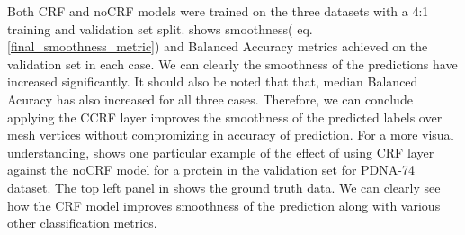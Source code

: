 Both CRF and noCRF models were trained on the three datasets with a 4:1 training and validation set
        split.  shows smoothness( eq.
        \ref{final_smoothness_metric}) and Balanced Accuracy  metrics achieved on the validation set
        in each case. We can clearly the smoothness of the predictions have increased significantly.
        It should also be noted that that, median Balanced Acuracy has also increased for all three
        cases. Therefore, we can conclude applying the CCRF layer improves the smoothness of the
        predicted labels over mesh vertices without compromizing in accuracy of prediction. For a
        more visual understanding,  shows one particular example
        of the effect of using CRF layer against the noCRF model for a protein in the validation set
        for PDNA-74 dataset. The top left panel in  shows the
        ground truth data. We can clearly see how the CRF model improves smoothness of the
        prediction along with various other classification metrics.


